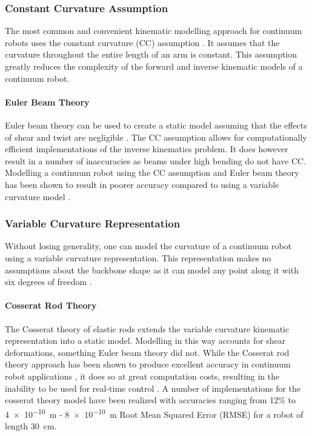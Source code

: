 \subsubsection{Constant Curvature Assumption}
The most common and convenient kinematic modelling approach for continuum robots uses the constant curvature (CC) assumption \cite{doi:10.1177/0278364910368147}. It assumes that the curvature throughout the entire length of an arm is constant. This assumption greatly reduces the complexity of the forward and inverse kinematic models of a continuum robot. 

\paragraph{Euler Beam Theory}
Euler beam theory can be used to create a static model assuming that the effects of shear and twist are negligible \cite{10.3389/frobt.2020.630245}. The CC assumption allows for computationally efficient implementations of the inverse kinematics problem. It does however result in a number of inaccuracies as beams under high bending do not have CC. Modelling a continuum robot using the CC assumption and Euler beam theory has been shown to result in poorer accuracy compared to using a variable curvature model \cite{10.3389/frobt.2020.630245}.

\subsubsection{Variable Curvature Representation}
Without losing generality, one can model the curvature of a continuum robot using a variable curvature representation. This representation makes no assumptions about the backbone shape as it can model any point along it with six degrees of freedom \cite{10.3389/frobt.2020.630245}.  

\paragraph{Cosserat Rod Theory}
The Cosserat theory of elastic rods extends the variable curvature kinematic representation into a static model. Modelling in this way accounts for shear deformations, something Euler beam theory did not. While the Cosserat rod theory approach has been shown to produce excellent accuracy in continuum robot applications \cite{10.3389/frobt.2020.630245, CAO2008460, ALQUMSAN201948, 10.1007/978-3-319-64107-2_56}, it does so at great computation costs, resulting in the inability to be used for real-time control \cite{10.3389/frobt.2020.630245, ALQUMSAN201948}. A number of implementations for the cosserat theory model have been realized with accuracies ranging from 12\%\cite{10.1007/978-3-319-64107-2_56} to \SI{4e-10}{m} - \SI{8e-10}{m} Root Mean Squared Error (RMSE) for a robot of length \SI{30}{cm}\cite{ALQUMSAN201948}. 


